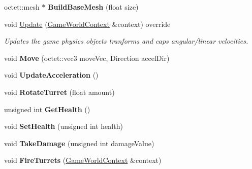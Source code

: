 \begin{DoxyCompactItemize}
\item 
\hypertarget{class_arena_1_1_player_a0b83f644e36f82b13bbbdaf002e2d784}{octet\+::mesh $\ast$ {\bfseries Build\+Base\+Mesh} (float size)}\label{class_arena_1_1_player_a0b83f644e36f82b13bbbdaf002e2d784}

\item 
\hypertarget{class_arena_1_1_player_ad050b166333495653886d883dae4da4a}{void \hyperlink{class_arena_1_1_player_ad050b166333495653886d883dae4da4a}{Update} (\hyperlink{struct_arena_1_1_game_world_context}{Game\+World\+Context} \&context) override}\label{class_arena_1_1_player_ad050b166333495653886d883dae4da4a}

\begin{DoxyCompactList}\small\item\em Updates the game physics objects tranforms and caps angular/linear velocities. \end{DoxyCompactList}\item 
\hypertarget{class_arena_1_1_player_af4a1b3d8a444e4a417d29806d5b2c4e3}{void {\bfseries Move} (octet\+::vec3 move\+Vec, Direction accel\+Dir)}\label{class_arena_1_1_player_af4a1b3d8a444e4a417d29806d5b2c4e3}

\item 
\hypertarget{class_arena_1_1_player_a376aa62b0d4d2bf358155300f2be8525}{void {\bfseries Update\+Acceleration} ()}\label{class_arena_1_1_player_a376aa62b0d4d2bf358155300f2be8525}

\item 
\hypertarget{class_arena_1_1_player_adc499cdfaba72bce0fe200ddb993adb3}{void {\bfseries Rotate\+Turret} (float amount)}\label{class_arena_1_1_player_adc499cdfaba72bce0fe200ddb993adb3}

\item 
\hypertarget{class_arena_1_1_player_a105dfdea93133a3e952d204b73677fd6}{unsigned int {\bfseries Get\+Health} ()}\label{class_arena_1_1_player_a105dfdea93133a3e952d204b73677fd6}

\item 
\hypertarget{class_arena_1_1_player_a1a9e5f5835b1d2daf954cadf7a2c13c0}{void {\bfseries Set\+Health} (unsigned int health)}\label{class_arena_1_1_player_a1a9e5f5835b1d2daf954cadf7a2c13c0}

\item 
\hypertarget{class_arena_1_1_player_ae059c8218e19ef39447c4d6325be79b9}{void {\bfseries Take\+Damage} (unsigned int damage\+Value)}\label{class_arena_1_1_player_ae059c8218e19ef39447c4d6325be79b9}

\item 
\hypertarget{class_arena_1_1_player_a30b0f9546f67c561f40f46f18f386f4b}{void {\bfseries Fire\+Turrets} (\hyperlink{struct_arena_1_1_game_world_context}{Game\+World\+Context} \&context)}\label{class_arena_1_1_player_a30b0f9546f67c561f40f46f18f386f4b}


\end{DoxyCompactItemize}
